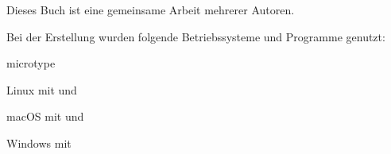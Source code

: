 



\listfiles


\frontmatter



\tableofcontents
\mainmatter




















\printbibliography




\vfill
{}

Dieses Buch ist eine gemeinsame Arbeit mehrerer Autoren.

Bei der Erstellung wurden folgende Betriebssysteme und Programme genutzt:

\begin{labeling}{microtype}
\item[Linux] mit  und 
\item[macOS] mit  und  %
\item[Windows] mit 
\end{labeling}

